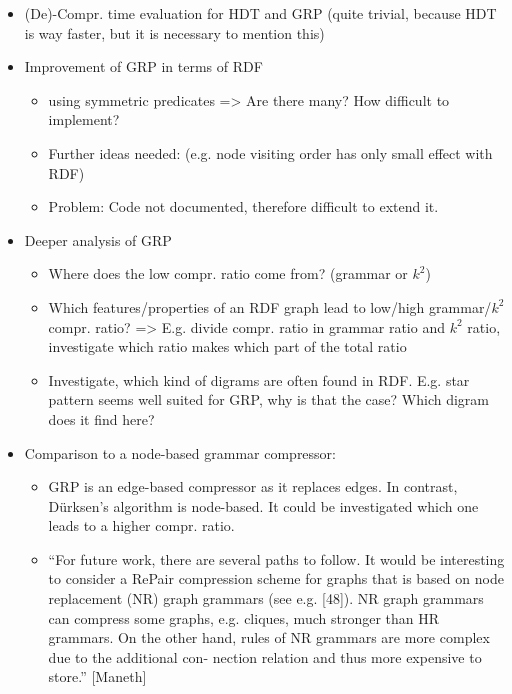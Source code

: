 \documentclass[a4paper]{scrartcl}
\begin{document}
\begin{itemize}
	\item (De)-Compr. time evaluation for HDT and GRP (quite trivial, because HDT is way faster, but it is necessary to mention this)
	\item Improvement of GRP in terms of RDF
	\begin{itemize}
		\item using symmetric predicates => Are there many? How difficult to implement?
		\item Further ideas needed: (e.g. node visiting order has only small effect with RDF)
		\item Problem: Code not documented, therefore difficult to extend it.
	\end{itemize}
	\item Deeper analysis of GRP
	\begin{itemize}
		\item Where does the low compr. ratio come from? (grammar or $ k^2 $)
		\item Which features/properties of an RDF graph lead to low/high grammar/$ k^2 $ compr. ratio? => E.g. divide compr. ratio in grammar ratio and $k^2$ ratio, investigate which ratio makes which part of the total ratio
		\item Investigate, which kind of digrams are often found in RDF. E.g. star pattern seems well suited for GRP, why is that the case? Which digram does it find here?
	\end{itemize}
	\item Comparison to a node-based grammar compressor:
	\begin{itemize}
			\item GRP is an edge-based compressor as it replaces edges. In contrast, Dürksen's algorithm is node-based. It could be investigated which one leads to a higher compr. ratio.
			\item \enquote{For future work, there are several paths to follow. It would be interesting to consider a RePair compression scheme for graphs that is based on node replacement (NR) graph grammars (see e.g. [48]). NR graph grammars can compress some graphs, e.g. cliques, much stronger than HR grammars. On the other hand, rules of NR grammars are more complex due to the additional con- nection relation and thus more expensive to store.} [Maneth]
	\end{itemize}

	
\end{itemize}
\end{document}
